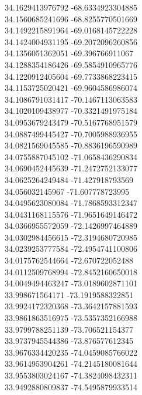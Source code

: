 {34.1629413976792	-68.6334923304885\\
34.1560685241696	-68.8255770501669\\
34.1492215891964	-69.0168145722228\\
34.1424004931195	-69.2072096260856\\
34.1356051362051	-69.396766911067\\
34.1288354186426	-69.5854910965776\\
34.1220912405604	-69.7733868223415\\
34.1153725020421	-69.9604586986074\\
34.1086791031417	-70.1467113063583\\
34.1020109438977	-70.3321491975184\\
34.0953679243479	-70.5167768951579\\
34.0887499445427	-70.7005988936955\\
34.0821569045585	-70.8836196590989\\
34.0755887045102	-71.0658436290834\\
34.0690452445639	-71.2472752133077\\
34.0625264249484	-71.427918793569\\
34.056032145967	-71.607778723995\\
34.0495623080084	-71.7868593312347\\
34.0431168115576	-71.9651649146472\\
34.0366955572059	-72.1426997464889\\
34.0302984456615	-72.3194680720985\\
34.0239253777584	-72.4954741100806\\
34.0175762544664	-72.670722052488\\
34.0112509768994	-72.8452160650018\\
34.0049494463247	-73.0189602871101\\
33.998671564171	-73.1919588322851\\
33.9924172320368	-73.3642157881593\\
33.9861863516975	-73.5357352166988\\
33.9799788251139	-73.706521154377\\
33.9737945544386	-73.876577612345\\
33.9676334420235	-74.0459085766022\\
33.9614953904261	-74.2145180081644\\
33.9553803024167	-74.3824098432311\\
33.9492880809837	-74.5495879933514\\
}
